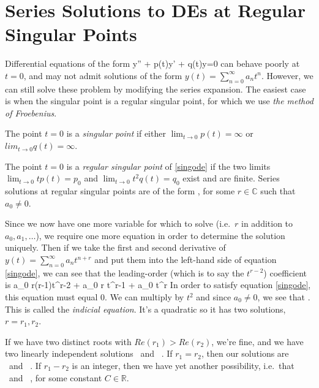 \documentclass[12pt]{book}
\begin{document}
\chapter{Series Solutions to DEs at Regular Singular Points}
Differential equations of the form
\be
\label{singode}
y'' + p(t)y' + q(t)y=0
\ee
can behave poorly at $t=0$, and may not admit solutions of the form
$y(t) =\sum_{n=0}^\infty a_n t^n$. However, we can still solve these problem
by modifying the series expansion. The easiest case is when the singular
point is a regular singular point, for which we use \emph{the method of
Froebenius}.

The point $t=0$ is a \emph{singular point} if either
$\lim_{t \rightarrow 0}p(t)=\infty$ or  $lim_{t \rightarrow 0}q(t)=\infty$.

The point $t=0$ is a \emph{regular singular point} of \eqref{singode} if
the two limits $\lim_{t\rightarrow 0} t p(t) =p_0$
and $\lim_{t\rightarrow 0} t^2 q(t) =q_0$
exist and are finite. Series solutions at regular singular points are of the
form
\be
{},
\ee
for some $r\in\mathbb{C}$ such that $a_0 \neq 0$.

Since we now have one more variable for which to solve (i.e.\ $r$ in addition
to $a_0, a_1,\dots$), we require one more equation in order to determine the
solution uniquely. Then if we take the first and second derivative of
$y(t) = \sum_{n=0}^\infty a_n t^{n+r}$ and put them into the left-hand side of
equation \eqref{singode}, we can see that the
leading-order (which is to say the $t^{r-2}$) coefficient is
\bee
a_0 r(r-1)t^{r-2} + a_0  r t^{r-1} + a_0  t^r
\eee
In order to satisfy equation \eqref{singode}, this equation must equal $0$.
We can multiply by $t^2$ and since $a_0 \neq 0$, we see that
\be
{}.
\ee
This is called the \emph{indicial equation}. It's a quadratic so it has two
solutions, $r=r_1,r_2$.

If we have two distinct roots with $Re(r_1) > Re(r_2)$, we're fine, and we
have two linearly independent solutions
\be
{}
\quad\mbox{  and  }\quad
{}.
\ee
If $r_1=r_2$, then our solutions are
\be
{}
\quad\mbox{  and  }\quad
{}.
\ee
If $r_1-r_2$ is an integer, then we have yet another possibility, i.e.\ that
\be
{}
\quad\mbox{  and  }\quad
{},
\ee
for some constant $C\in\mathbb{R}$.
\end{document}
